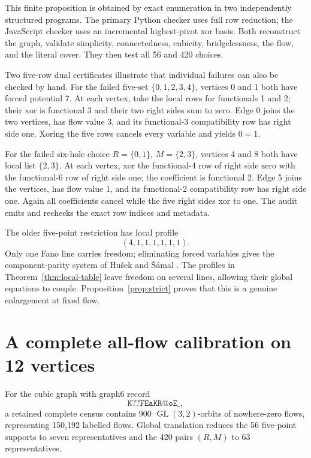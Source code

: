 \documentclass[11pt]{article}
\theoremstyle{definition}
\theoremstyle{remark}
\numberwithin{equation}{section}
\begin{document}
This finite proposition is obtained by exact enumeration in two
independently structured programs.  The primary Python checker uses full
row reduction; the JavaScript checker uses an incremental highest-pivot
xor basis.  Both reconstruct the graph, validate simplicity,
connectedness, cubicity, bridgelessness, the flow, and the literal cover.
They then test all 56 and 420 choices.

Two five-row dual certificates illustrate that individual failures can
also be checked by hand.  For the failed five-set
\(\{0,1,2,3,4\}\), vertices 0 and 1 both have forced potential 7.
At each vertex, take the local rows for functionals 1 and 2; their xor
is functional 3 and their two right sides sum to zero.  Edge 0 joins
the two vertices, has flow value 3, and its functional-3 compatibility
row has right side one.  Xoring the five rows cancels every variable
and yields \(0=1\).

For the failed six-hole choice \(R=\{0,1\}\), \(M=\{2,3\}\), vertices
4 and 8 both have local list \(\{2,3\}\).  At each vertex, xor the
functional-4 row of right side zero with the functional-6 row of right
side one; the coefficient is functional 2.  Edge 5 joins the vertices,
has flow value 1, and its functional-2 compatibility row has right side
one.  Again all coefficients cancel while the five right sides xor to
one.  The audit emits and rechecks the exact row indices and metadata.

The older five-point restriction has local profile
\[
                         (4,1,1,1,1,1,1).
\]
Only one Fano line carries freedom; eliminating forced variables gives
the component-parity system of Hu\v{s}ek and \v{S}\'amal
\cite{HusekSamal2026}.  The profiles in
Theorem~\ref{thm:local-table} leave freedom on several lines, allowing
their global equations to couple.  Proposition~\ref{prop:strict} proves
that this is a genuine enlargement at fixed flow.

\section{A complete all-flow calibration on 12 vertices}

For the cubic graph with graph6 record
\[
                             \texttt{K??FEaKR@oE\_},
\]
a retained complete census contains 900
\(\operatorname{GL}(3,2)\)-orbits of nowhere-zero flows, representing
150,192 labelled flows.  Global translation reduces the 56 five-point
supports to seven representatives and the 420 pairs \((R,M)\) to 63
representatives.
\end{document}
